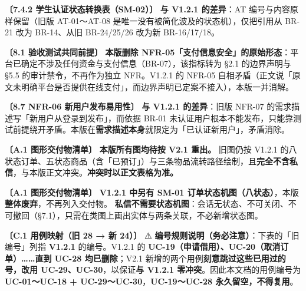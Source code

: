 \documentclass[12pt,a4paper]{ctexart}
\begin{document}
\vspace{0.35em}
{\small\textbf{〔7.4.2 学生认证状态转换表（SM-02）〕} \textbf{与 V1.2.1 的差异}：AT 编号与内容原样保留（旧版 AT-01～AT-08 是唯一没有被简化波及的状态机），仅把引用从 BR-21 改为 BR-14、从旧 BR-24/25/26 改为新 BR-16/17/18。}\par
\vspace{0.35em}
{\small\textbf{〔8.1 验收测试共同前提〕} \textbf{本版删除 NFR-05「支付信息安全」的原始形态}：平台已确定不涉及任何资金与支付信息（BR-07），该指标转为 §2.1 的边界声明与 §5.5 的审计禁令，不再作为独立 NFR。V1.2.1 的 NFR-05 自相矛盾（正文说「原文未明确平台是否提供在线支付」，而边界声明已定案不接入），本版一并消解。}\par
\vspace{0.35em}
{\small\textbf{〔8.7 NFR-06 新用户发布易用性〕} \textbf{与 V1.2.1 的差异}：旧版 NFR-07 的需求描述写「新用户从登录到发布」，而依据 BR-01 未认证用户根本不能发布，只能靠测试前提绕开矛盾。本版在\textbf{需求描述本身}就限定为「已认证新用户」，矛盾消除。}\par
\vspace{0.35em}
{\small\textbf{〔A.1 图形交付物清单〕} \textbf{本版所有图均待按 V2.1 重出。} 旧图仍按 V1.2.1 的八状态订单、五状态商品（含「已预订」）与三条物品流转路径绘制，且\textbf{完全不含私信}，与本版正文冲突。\textbf{冲突时以正文表格为准。}}\par
\vspace{0.35em}
{\small\textbf{〔A.1 图形交付物清单〕} \textbf{V1.2.1 中另有 SM-01 订单状态机图（八状态）}，本版\textbf{整体废弃}，不再列入交付物。 \textbf{私信不需要状态机图}：会话无状态、不可关闭、不可撤回（§7.1），只需在类图上画出实体与两条关联，不必新增状态图。}\par
\vspace{0.35em}
{\small\textbf{〔C.1 用例映射（旧 28 → 新 24）〕} ⚠️ \textbf{编号规则说明（务必注意）}：下表的「旧编号」列指 \textbf{V1.2.1} 的编号。V1.2.1 的 \textbf{UC-19（申请借用）、UC-20（取消订单）……直到 UC-28 均已删除}；V2.1 新增的两个用例\textbf{刻意跳过这些已用过的号，改用 UC-29、UC-30}，以保证\textbf{与 V1.2.1 零冲突}。因此本文档的用例编号为 \textbf{UC-01～UC-18 + UC-29～UC-30}，\textbf{UC-19～UC-28 永久留空，不得复用}。}\par
\vspace{0.35em}
\end{document}
